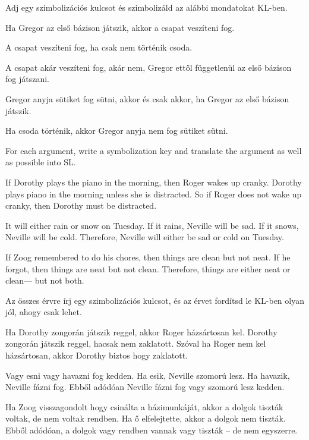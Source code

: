 \problempart Adj egy szimbolizációs kulcsot és szimbolizáld az alábbi mondatokat KL-ben.
\begin{earg}
\item Ha Gregor az első bázison játszik, akkor a csapat veszíteni fog.
\item A csapat veszíteni fog, ha csak nem történik csoda.
\item A csapat akár veszíteni fog, akár nem, Gregor ettől függetlenül az első bázison fog játszani.
\item Gregor anyja sütiket fog sütni, akkor és csak akkor, ha Gregor az első bázison játszik.
\item Ha csoda történik, akkor Gregor anyja nem fog sütiket sütni.
\end{earg}


\problempart
For each argument, write a symbolization key and translate the argument as well as possible into SL.
\begin{earg}
\item If Dorothy plays the piano in the morning, then Roger wakes up cranky. Dorothy plays piano in the morning unless she is distracted. So if Roger does not wake up cranky, then Dorothy must be distracted.
\item It will either rain or snow on Tuesday. If it rains, Neville will be sad. If it snows, Neville will be cold. Therefore, Neville will either be sad or cold on Tuesday.
\item If Zoog remembered to do his chores, then things are clean but not neat. If he forgot, then things are neat but not clean. Therefore, things are either neat or clean--- but not both.
\end{earg}


\problempart
Az összes érvre írj egy szimbolizációs kulcsot, és az érvet fordítsd le KL-ben olyan jól, ahogy csak lehet.
\begin{earg}
\item Ha Dorothy zongorán játszik reggel, akkor Roger házsártosan kel. Dorothy zongorán játszik reggel, hacsak nem zaklatott. Szóval ha Roger nem kel házsártosan, akkor Dorothy biztos hogy zaklatott.
\item Vagy esni vagy havazni fog kedden. Ha esik, Neville szomorú lesz. Ha havazik, Neville fázni fog. Ebből adódóan Neville fázni fog vagy szomorú lesz kedden.
\item Ha Zoog visszagondolt hogy csinálta a házimunkáját, akkor a dolgok tiszták voltak, de nem voltak rendben. Ha ő elfelejtette, akkor a dolgok nem tiszták. Ebből adódóan, a dolgok vagy rendben vannak vagy tiszták – de nem egyszerre.
\end{earg}



